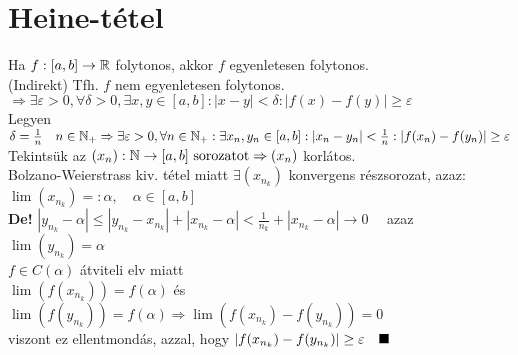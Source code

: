\documentclass[a4paper,12pt]{article}
\begin{document}
\section{Heine-tétel}
\tetel Ha $f:[a,b]\to\mathbb{R}$ folytonos, akkor $f$ egyenletesen folytonos.\\[0.1cm]
\biz (Indirekt) Tfh. $f$ nem egyenletesen folytonos.\\[0.1cm]
$\Rightarrow\exists\varepsilon>0,\forall\delta>0,\exists x,y\in[a,b]:|x-y|<\delta:
|f(x)-f(y)|\geq\varepsilon$\\[0.1cm] Legyen $\delta=\frac{1}{n}\quad n\in\mathbb{N}_+
\Rightarrow\exists\varepsilon>0,\forall n\in\mathbb{N}_+:\exists x_n,y_n\in[a,b]:|x_n-y_n|
<\frac{1}{n}:|f(x_n)-f(y_n)|\geq\varepsilon$ \\[0.1cm] Tekintsük az $(x_n): 
\mathbb{N}\to[a,b]\text{ sorozatot}\Rightarrow (x_n)$ korlátos.\\[0.1cm]
Bolzano-Weierstrass kiv. tétel miatt $\exists(x_{n_k})$ konvergens részsorozat,
azaz:\\[0.1cm] $\lim(x_{n_k})=:\alpha,\quad\alpha\in[a,b]$\\[0.1cm]\textbf{De!}
$|y_{n_k}-\alpha|\leq|y_{n_k}-x_{n_k}|+|x_{n_k}-\alpha|<\frac{1}{n_k}
+|x_{n_k}-\alpha|\to0\quad$ azaz $\lim(y_{n_k})=\alpha$\\[0.1cm] $f\in C(\alpha)$
átviteli elv miatt\\[0.1cm]$\lim(f(x_{n_k}))=f(\alpha)$ és $\lim(f(y_{n_k}))=
f(\alpha)\Rightarrow\lim(f(x_{n_k})-f(y_{n_k}))=0$\\[0.1cm] viszont ez
ellentmondás, azzal, hogy $|f(x_{n_k})-f(y_{n_k})|\geq\varepsilon\quad\blacksquare$
\end{document}
